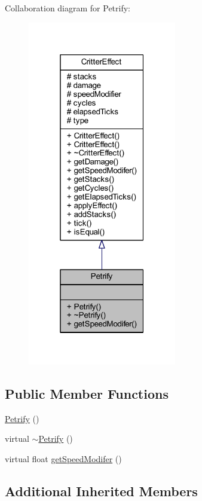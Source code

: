 Collaboration diagram for Petrify\+:\nopagebreak
\begin{figure}[H]
\begin{center}
\leavevmode
\includegraphics[width=184pt]{struct_petrify__coll__graph}
\end{center}
\end{figure}
\subsection*{Public Member Functions}
\begin{DoxyCompactItemize}
\item 
\hyperlink{struct_petrify_a992aeb210a1e24c89600ed56a5f5b767}{Petrify} ()
\item 
virtual \hyperlink{struct_petrify_a091e1ab7cf7331d51ad5e3a466aa5e56}{$\sim$\+Petrify} ()
\item 
virtual float \hyperlink{struct_petrify_a5dbc65a84dfd4f6f809e39af9c33adfd}{get\+Speed\+Modifer} ()
\end{DoxyCompactItemize}
\subsection*{Additional Inherited Members}


